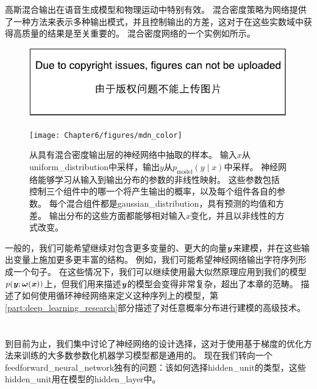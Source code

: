 
高斯混合输出在语音生成模型\citep{schuster1999supervised}和物理运动\citep{Graves-arxiv2013}中特别有效。
混合密度策略为网络提供了一种方法来表示多种输出模式，并且控制输出的方差，这对于在这些实数域中获得高质量的结果是至关重要的。
混合密度网络的一个实例如所示。
\begin{figure}[!htb]
\ifOpenSource
\centerline{\includegraphics{figure.pdf}}
\else
\centerline{\texttt{[image: Chapter6/figures/mdn\_color]}}
\fi
\captionsetup{singlelinecheck=off}
\caption{从具有混合密度输出层的神经网络中抽取的样本。
输入$x$从\gls{uniform_distribution}中采样，输出$y$从$p_{\text{model}}(y\mid x)$中采样。 神经网络能够学习从输入到输出分布的参数的非线性映射。 这些参数包括控制三个组件中的哪一个将产生输出的概率，以及每个组件各自的参数。
每个混合组件都是\gls{gaussian_distribution}，具有预测的均值和方差。 输出分布的这些方面都能够相对输入$x$变化，并且以非线性的方式改变。}
\label{fig:chap6_mdn_color}
\end{figure}


一般的，我们可能希望继续对包含更多变量的、更大的向量$\boldsymbol{\mathit{y}}$来建模，并在这些输出变量上施加更多更丰富的结构。
例如，我们可能希望神经网络输出字符序列形成一个句子。
在这些情况下，我们可以继续使用最大似然原理应用到我们的模型$p(\boldsymbol{\mathit{y}};\boldsymbol{\omega}(\boldsymbol{\mathit{x}}))$上，但我们用来描述$\boldsymbol{\mathit{y}}$的模型会变得非常复杂，超出了本章的范畴。
描述了如何使用循环神经网络来定义这种序列上的模型，第\ref{part:deep_learning_research}部分描述了对任意概率分布进行建模的高级技术。

\section{}
\label{sec:hidden_units}

到目前为止，我们集中讨论了神经网络的设计选择，这对于使用基于梯度的优化方法来训练的大多数参数化机器学习模型都是通用的。
现在我们转向一个\gls{feedforward_neural_network}独有的问题：该如何选择\gls{hidden_unit}的类型，这些\gls{hidden_unit}用在模型的\gls{hidden_layer}中。


